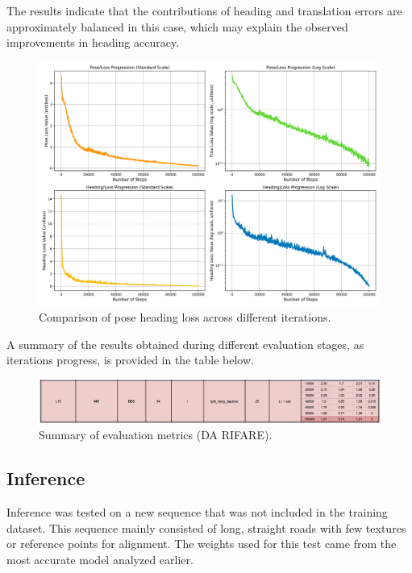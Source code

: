 The results indicate that the contributions of heading and translation errors are approximately balanced in this case, which may explain the observed improvements in heading accuracy.
\begin{figure}[H]
    \centering
    \includegraphics[width=1\linewidth]{LateX//figs/l1sDEG_pose_heading_loss_comparison.png}
    \caption{Comparison of pose heading loss across different iterations.}
    \label{fig:pose-heading-loss}
\end{figure}

A summary of the results obtained during different evaluation stages, as iterations progress, is provided in the table below.
\begin{figure}[H]
    \centering
    \includegraphics[width=1\linewidth]{LateX//figs/Screenshot 2024-11-15 at 14.26.05.png}
    \caption{Summary of evaluation metrics (DA RIFARE).}
    \label{fig:evaluation-summary}
\end{figure}

\subsection{Inference}
Inference was tested on a new sequence that was not included in the training dataset. This sequence mainly consisted of long, straight roads with few textures or reference points for alignment. The weights used for this test came from the most accurate model analyzed earlier.

